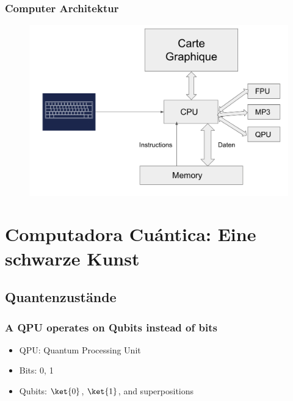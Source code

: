 \documentclass{beamer}
\begin{document}
\begin{frame}
\frametitle{Computer Architektur}
\begin{figure}
\centering
\includegraphics[width=\textwidth]{qpu.png}
\label{qpu}
\end{figure}
\end{frame}

\section{Computadora Cu\'antica: Eine schwarze Kunst}

\subsection{Quantenzust\"ande}

\begin{frame}
\frametitle{A QPU operates on Qubits instead of bits}
\begin{itemize}
	\item QPU: Quantum Processing Unit
	\item Bits: 0, 1
	\item Qubits: $\ket{0}$, $\ket{1}$, and superpositions
\end{itemize}
\end{frame}
\end{document}
